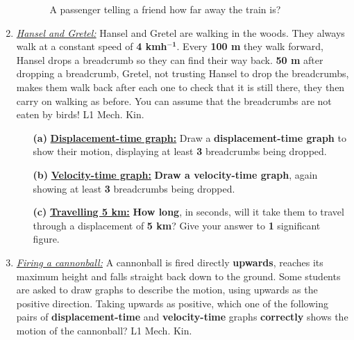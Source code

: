 \documentclass[A4,12pt]{article}
\begin{document}
\begin{enumerate}[label=\bfseries (\arabic*)]
\begin{itemize}
\begin{itemize}
            \item[\textbullet] A passenger telling a friend how far away the train is?
        \end{itemize}
\end{itemize}
%
%
%
%
%
%
%
%
%
%
%
%
%
%
%
%
%
%
%
%
%
%
%
%
\item \href{https://isaacphysics.org/questions/hansel_and_gretel?board=aa9cd909-45d0-45da-921f-d2435c9b3afc}{\it Hansel and Gretel:} Hansel and Gretel are walking in the woods. They always walk at a constant speed of \textbf{4 kmh}$\bm{^{-1}}$. Every \textbf{100 m} they walk forward, Hansel drops a breadcrumb so they can find their way back. \textbf{50 m} after dropping a breadcrumb, Gretel, not trusting Hansel to drop the breadcrumbs, makes them walk back after each one to check that it is still there, they then carry on walking as before. You can assume that the breadcrumbs are not eaten by birds! \cite{Jardine-Wright} L1 Mech. Kin.
\begin{itemize}
    \item[\bf (a)] \href{https://isaacphysics.org/questions/hansel_and_gretel?board=aa9cd909-45d0-45da-921f-d2435c9b3afc}{\bf Displacement-time graph:} Draw a \textbf{displacement-time graph} to show their motion, displaying at least \textbf{3} breadcrumbs being dropped.
    \item[\bf (b)] \href{https://isaacphysics.org/questions/hansel_and_gretel?board=aa9cd909-45d0-45da-921f-d2435c9b3afc}{\bf Velocity-time graph:} \textbf{Draw a velocity-time graph}, again showing at least \textbf{3} breadcrumbs being dropped.
    \item[\bf (c)] \href{https://isaacphysics.org/questions/hansel_and_gretel?board=aa9cd909-45d0-45da-921f-d2435c9b3afc}{\bf Travelling 5 km:} \textbf{How long}, in seconds, will it take them to travel through a displacement of \textbf{5 km}? Give your answer to \textbf{1} significant figure.
\end{itemize}
%
%
%
%
%
%
%
%
%
%
%
%
%
%
%
%
%
%
%
%
%
%
\item \href{https://isaacphysics.org/questions/firing_a_cannonball?board=aa9cd909-45d0-45da-921f-d2435c9b3afc}{\it Firing a cannonball:} A cannonball is fired directly \textbf{upwards}, reaches its maximum height and falls straight back down to the ground. Some students are asked to draw graphs to describe the motion, using upwards as the positive direction. Taking upwards as positive, which one of the following pairs of \textbf{displacement-time} and \textbf{velocity-time} graphs \textbf{correctly} shows the motion of the cannonball? \cite{Jardine-Wright} L1 Mech. Kin.

\end{enumerate}
\end{document}
